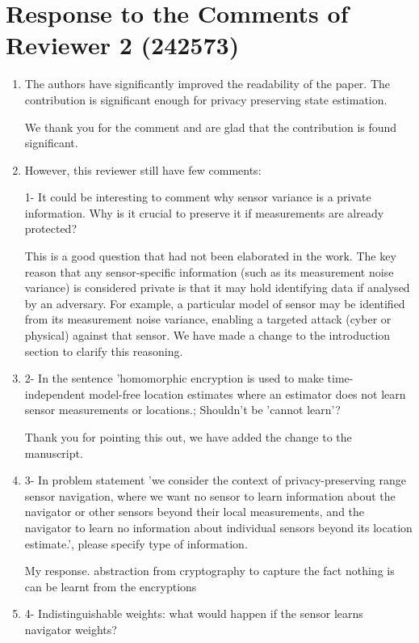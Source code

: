 \documentclass[a4paper]{scrartcl}
\newenvironment{rebuttal}{\begin{enumerate}[label={\color{grey}\thesection.\arabic{enumi}},leftmargin=0pt,ref=\thesection.\arabic{enumi}]}{\end{enumerate}}
\newcommand{\reviewtext}[1]{{\color{nblue} #1}}
\begin{document}
\section*{Response to the Comments of Reviewer 2 (242573)}
\def\thesection{R2}
\begin{rebuttal}
\item \reviewtext{The authors have significantly improved the readability of the paper. The contribution is significant enough for privacy preserving state estimation.}

We thank you for the comment and are glad that the contribution is found significant.

\item \reviewtext{However, this reviewer still have few comments:

1- It could be interesting to comment why sensor variance is a private information. Why is it crucial to preserve it if measurements are already protected?}

This is a good question that had not been elaborated in the work. The key reason that any sensor-specific information (such as its measurement noise variance) is considered private is that it may hold identifying data if analysed by an adversary. For example, a particular model of sensor may be identified from its measurement noise variance, enabling a targeted attack (cyber or physical) against that sensor. We have made a change to the introduction section to clarify this reasoning.

\item \reviewtext{2- In the sentence 'homomorphic encryption is used to make time-independent model-free location estimates where an estimator does not learn sensor measurements or locations.; Shouldn't be 'cannot learn'?}

Thank you for pointing this out, we have added the change to the manuscript.

\item \reviewtext{3- In problem statement 'we consider the context of privacy-preserving range sensor navigation, where we want no sensor to learn information about the navigator or other sensors beyond their local measurements, and the navigator to learn no information about individual sensors beyond its location estimate.', please specify type of information.}

My response.
abstraction from cryptography to capture the fact nothing is can be learnt from the encryptions

\item \reviewtext{4- Indistinguishable weights: what would happen if the sensor learns navigator weights?}


\end{rebuttal}
\end{document}
